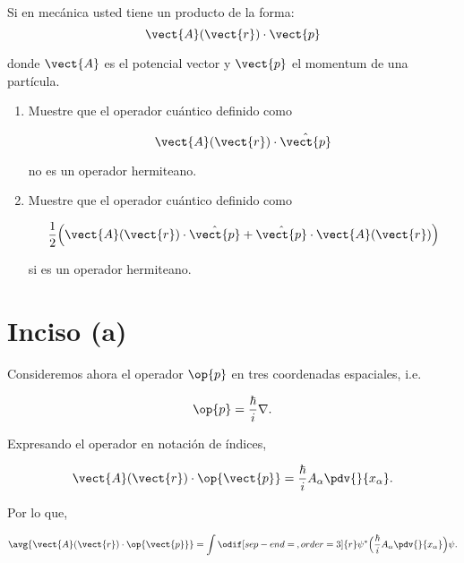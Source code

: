 \documentclass[../main.tex]{subfiles}
\begin{document}
\begin{problema}[20]
	Si en mecánica usted tiene un producto de la forma:
	\begin{equation*}
		\vect{A}(\vect{r})\cdot \vect{p}
	\end{equation*}

	donde \(\vect{A}\) es el potencial vector y \(\vect{p}\) el
	momentum de una partícula.

	\begin{enumerate}
		\item Muestre que el operador cuántico definido como

		      \begin{equation*}
			      \vect{A}(\vect{r})\cdot \hat{\vect{p}}
		      \end{equation*}

		      no es un operador hermiteano.
		\item Muestre que el operador cuántico definido como

		      \begin{equation*}
			      \dfrac{1}{2}\Bigl(\vect{A}(\vect{r})\cdot \hat{\vect{p}} + \hat{\vect{p}}\cdot \vect{A}(\vect{r})\Bigr)
		      \end{equation*}

		      si es un operador hermiteano.
	\end{enumerate}

	\startsolution

	\section{Inciso (a)}

	Consideremos ahora el operador \(\op{p}\) en tres coordenadas espaciales, i.e.

	\begin{equation*}
		\op{p} = \dfrac{\hbar}{i}\nabla.
	\end{equation*}

	Expresando el operador en notación de índices,

	\begin{equation*}
		\vect{A}(\vect{r}) \cdot \op{\vect{p}} = \dfrac{\hbar}{i}A_{\alpha}\pdv{}{x_{\alpha}}.
	\end{equation*}

	Por lo que,

	\begin{equation*}
		\avg{\vect{A}(\vect{r}) \cdot \op{\vect{p}}} = \int \odif[sep-end=\medspace, order = 3]{r} \psi^{*}\Bigl(\dfrac{\hbar}{i}A_{\alpha}\pdv{}{x_{\alpha}}\Bigr)\psi.
	\end{equation*}


\end{problema}
\end{document}
